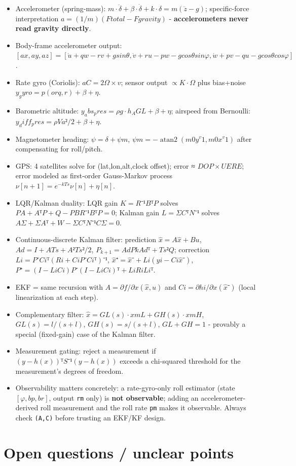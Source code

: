 \documentclass[11pt]{article}
\begin{document}
\begin{itemize}
\item Accelerometer (spring-mass): $m·\ddot{δ} + β·\dot{δ} + k·δ = m(\ddot{z}-g)$; specific-force interpretation $a = (1/m)(Ftotal - Fgravity)$ - \textbf{accelerometers never read gravity directly}.
\item Body-frame accelerometer output: $[ax,ay,az] = [\dot{u}+qw-rv+g sinθ, \dot{v}+ru-pw-g cosθ sinφ, \dot{w}+pv-qu-g cosθ cosφ]$.
\item Rate gyro (Coriolis): $aC = 2Ω×v$; sensor output $∝ K·Ω$ plus bias+noise $y_gyro = p (or q,r) + β + η$.
\item Barometric altitude: $y_abs_pres = ρg·h_AGL + β + η$; airspeed from Bernoulli: $y_diff_pres = ρVa²/2 + β + η$.
\item Magnetometer heading: $ψ = δ + ψm$, $ψm = -\operatorname{atan2}(m0y^v1, m0x^v1)$ after compensating for roll/pitch.
\item GPS: 4 satellites solve for (lat,lon,alt,clock offset); error ≈ $DOP × UERE$; error modeled as first-order Gauss-Markov process $ν[n+1]=e^{-kTs}ν[n]+η[n]$.
\item LQR/Kalman duality: LQR gain $K=R⁻¹BᵀP$ solves $PA+AᵀP+Q-PBR⁻¹BᵀP=0$; Kalman gain $L=ΣCᵀN⁻¹$ solves $AΣ+ΣAᵀ+W-ΣCᵀN⁻¹CΣ=0$.
\item Continuous-discrete Kalman filter: prediction $\hat{x\dot{}}=A\hat{x}+Bu$, $Ad=I+ATs+A²Ts²/2$, $P_{k+1}=AdPkAdᵀ+Ts²Q$; correction $Li=P⁻Ciᵀ(Ri+CiP⁻Ciᵀ)⁻¹$, $\hat{x}⁺=\hat{x}⁻+Li(yi-Ci\hat{x}⁻)$, $P⁺=(I-LiCi)P⁻(I-LiCi)ᵀ+LiRiLiᵀ$.
\item EKF = same recursion with $A=∂f/∂x(\hat{x},u)$ and $Ci=∂hi/∂x(\hat{x}⁻)$ (local linearization at each step).
\item Complementary filter: $\hat{x} = GL(s)·xmL + GH(s)·xmH$, $GL(s)=l/(s+l)$, $GH(s)=s/(s+l)$, $GL+GH=1$ - provably a special (fixed-gain) case of the Kalman filter.
\item Measurement gating: reject a measurement if $(y-h(x))ᵀS⁻¹(y-h(x))$ exceeds a chi-squared threshold for the measurement's degrees of freedom.
\item Observability matters concretely: a rate-gyro-only roll estimator (state $[φ,bp,br]$, output \texttt{rm} only) is \textbf{not observable}; adding an accelerometer-derived roll measurement and the roll rate \texttt{pm} makes it observable. Always check \texttt{(A,C)} before trusting an EKF/KF design.
\end{itemize}

\section{Open questions / unclear points}
\end{document}
